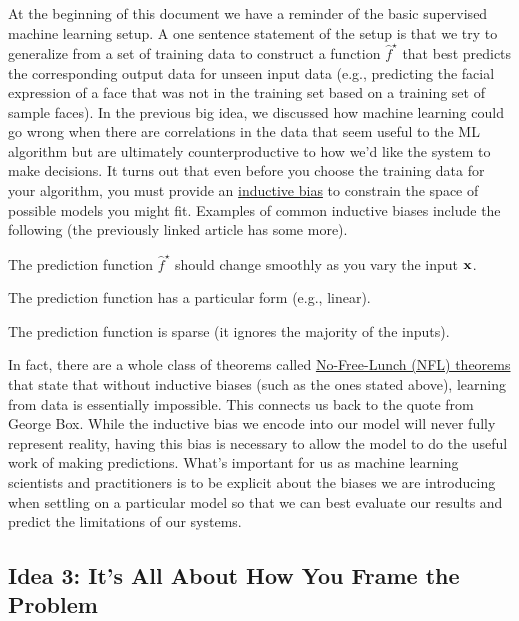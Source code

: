 \documentclass[assignment01_Solutions]{subfiles}
\begin{document}
At the beginning of this document we have a reminder of the basic supervised machine learning setup.  A one sentence statement of the setup is that we try to generalize from a set of training data to construct a function $\hat{f}^\star$ that best predicts the corresponding output data for unseen input data (e.g., predicting the facial expression of a face that was not in the training set based on a training set of sample faces).  In the previous big idea, we discussed how machine learning could go wrong when there are correlations in the data that seem useful to the ML algorithm but are ultimately counterproductive to how we'd like the system to make decisions.  It turns out that even before you choose the training data for your algorithm, you must provide an \href{https://en.wikipedia.org/wiki/Inductive_bias}{inductive bias} to constrain the space of possible models you might fit.  Examples of common inductive biases include the following (the previously linked article has some more).
\be
\item The prediction function $\hat{f}^\star$ should change smoothly as you vary the input $\mathbf{x}$.
\item The prediction function has a particular form (e.g., linear).
\item The prediction function is sparse (it ignores the majority of the inputs).
\ee

In fact, there are a whole class of theorems called \href{https://en.wikipedia.org/wiki/No_free_lunch_theorem}{No-Free-Lunch (NFL) theorems} that state that without inductive biases (such as the ones stated above), learning from data is essentially impossible.  This connects us back to the quote from George Box.  While the inductive bias we encode into our model will never fully represent reality, having this bias is necessary to allow the model to do the useful work of making predictions.  What's important for us as machine learning scientists and practitioners is to be explicit about the biases we are introducing when settling on a particular model so that we can best evaluate our results and predict the limitations of our systems.

\subsection*{Idea 3: It's All About How You Frame the Problem}
\end{document}

